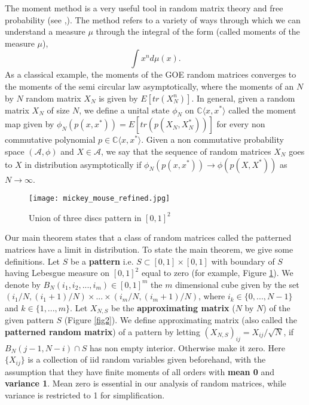 \documentclass[12pt]{amsart}
\theoremstyle{definition}
\theoremstyle{remark}
\begin{document}
The moment method is a very useful tool in random matrix theory and free probability (see \cite{mingo2017free},\cite{bose2008another}). The method refers to a variety of ways through which we can understand a measure $\mu$ through the integral of the form (called moments of the measure $\mu$), $$\int x^n d \mu(x).$$
As a classical example, the moments of the GOE random matrices converges to the moments of the semi circular law asymptotically, where the moments of an $N$ by $N$ random matrix $X_N$ is given by $E[tr(X_N^n)]$. In general, given a random matrix $X_N$ of size $N$, we define a unital state $\phi_N$ on $\mathbb{C}\langle x,x^* \rangle$ called the moment map given by  $\phi_N(p(x,x^*)) = E[tr(p(X_N,X_N^*))]$ for every non commutative polynomial $p \in \mathbb{C}\langle x,x^* \rangle$. Given a non commutative probability space $(\mathcal{A},\phi)$ and $X \in \mathcal{A}$, we say that the sequence of random matrices $X_N $ goes to $X$ in distribution asymptotically if $\phi_N(p(x,x^*)) \to \phi(p(X,X^*)) $ as $N \to \infty$.\\


\begin{figure}
  \centering
  \texttt{[image: mickey\_mouse\_refined.jpg]}
  \caption{Union of three discs pattern in $[0,1]^2$}
  \label{3disc}
\end{figure}


Our main theorem states that a class of random matrices called the patterned matrices have a limit in distribution. To state the main theorem, we give some definitions. Let $S$ be a \textbf{pattern} i.e. $S \subset [0,1] \times [0,1]$ with boundary of $S$ having Lebesgue measure on $[0,1]^2$ equal to zero (for example, Figure \ref{3disc}).  We denote by $B_N(i_1,i_2,...,i_m) \in [0,1]^m$ the $m$ dimensional cube given by the set $(i_1/N,(i_1+1)/N) \times ... \times (i_m/N,(i_m + 1)/N)$, where $i_k \in \{0,...,N-1\}$ and $ k \in \{1,...,m\}$. Let $X_{N,S}$ be the \textbf{approximating matrix} ($N$ by $N$) of the given pattern $S$ (Figure \ref{fig2}). We define approximating matrix (also called the \textbf{patterned random matrix}) of a pattern by letting $(X_{N,S})_{ij}= X_{ij}/\sqrt{N}$, if $B_N(j-1,N-i) \cap S$ has non empty interior. Otherwise make it zero. Here $\{X_{ij}\}$ is a collection of iid random variables given beforehand, with the assumption that they have finite moments of all orders with \textbf{mean 0} and \textbf{variance 1}. Mean zero is essential in our analysis of random matrices, while variance is restricted to 1 for simplification.\\
\end{document}
